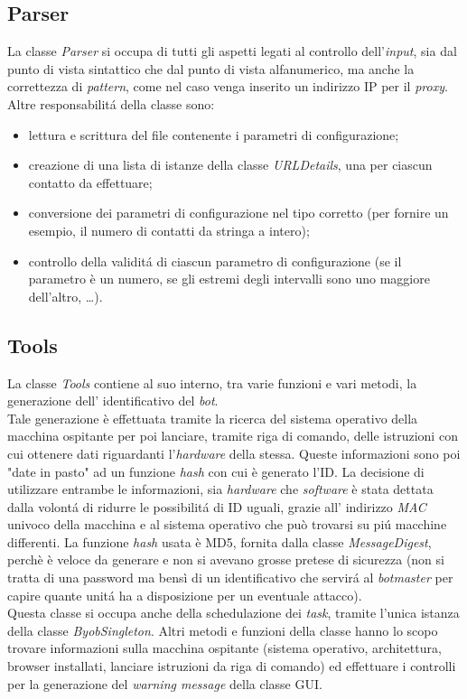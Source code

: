 \vspace*{0.5cm}
\subsection{Parser}
La classe \textit{Parser} si occupa di tutti gli aspetti legati al controllo dell'\textit{input}, sia dal punto di vista sintattico che dal punto di vista alfanumerico, ma anche la correttezza di \textit{pattern}, come nel caso venga inserito un indirizzo IP per il \textit{proxy}. Altre responsabilit\'a della classe sono:
\begin{itemize}
\item lettura e scrittura del file contenente i parametri di configurazione;
\item creazione di una lista di istanze della classe \textit{URLDetails}, una per ciascun contatto da effettuare;
\item conversione dei parametri di configurazione nel tipo corretto (per fornire un esempio, il numero di contatti da stringa a intero);
\item controllo della validit\'a di ciascun parametro di configurazione (se il parametro \`e un numero, se gli estremi degli intervalli sono uno maggiore dell'altro, \dots ).
\end{itemize}

\vspace*{0.5cm}
\subsection{Tools}
La classe \textit{Tools} contiene al suo interno, tra varie funzioni e vari metodi, la generazione dell' identificativo del \textit{bot}.\\
Tale generazione \`e effettuata tramite la ricerca del sistema operativo della macchina ospitante per poi lanciare, tramite riga di comando, delle istruzioni con cui ottenere dati riguardanti l'\textit{hardware} della stessa. Queste informazioni  sono poi "date in pasto" ad un funzione \textit{hash} con cui \`e generato l'ID. La decisione di utilizzare entrambe le informazioni, sia \textit{hardware} che \textit{software} \`e stata dettata dalla volont\'a di ridurre le possibilit\'a di ID uguali, grazie all' indirizzo \textit{MAC} univoco della macchina e al sistema operativo che pu\`o trovarsi su pi\'u macchine differenti.
La funzione \textit{hash} usata \`e MD5, fornita dalla classe \textit{MessageDigest}, perch\`e \`e veloce da generare e non si avevano grosse pretese di sicurezza (non si tratta di una password ma bens\`i di un identificativo che servir\'a al \textit{botmaster} per capire quante unit\'a ha a disposizione per un eventuale attacco).\\
Questa classe si occupa anche della schedulazione dei \textit{task}, tramite l'unica istanza della classe \textit{ByobSingleton}.
Altri metodi e funzioni della classe hanno lo scopo trovare informazioni sulla macchina ospitante (sistema operativo, architettura, browser installati, lanciare istruzioni da riga di comando) ed effettuare i controlli per la generazione del \textit{warning message} della classe GUI.

